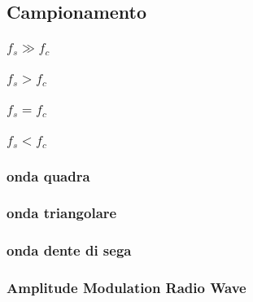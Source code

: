 \subsection{Campionamento}
\subsubsection{$f_s \gg f_c$}
\subsubsection{$f_s > f_c$}
\subsubsection{$f_s = f_c$}
\subsubsection{$f_s < f_c$}
\subsubsection{onda quadra}
\subsubsection{onda triangolare}
\subsubsection{onda dente di sega}
\subsubsection{Amplitude Modulation Radio Wave}
